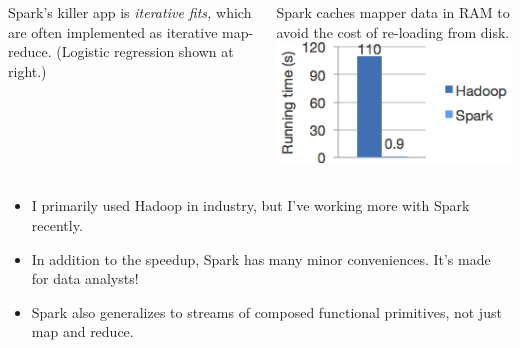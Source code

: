 \documentclass{beamer}
\begin{document}
\begin{frame}{}
\begin{columns}
Spark's killer app is {\it iterative fits,} which are often implemented as iterative map-reduce. (Logistic regression shown at right.)

\vspace{0.2 cm}
Spark caches mapper data in RAM to avoid the cost of re-loading from disk.
\includegraphics[width=\linewidth]{spark_time.png}
\end{columns}

\vfill
\begin{itemize}
\item I primarily used Hadoop in industry, but I've working more with Spark recently.
\item In addition to the speedup, Spark has many minor conveniences. It's made for data analysts!
\item Spark also generalizes to streams of composed functional primitives, not just map and reduce.
\end{itemize}
\end{frame}
\end{document}
